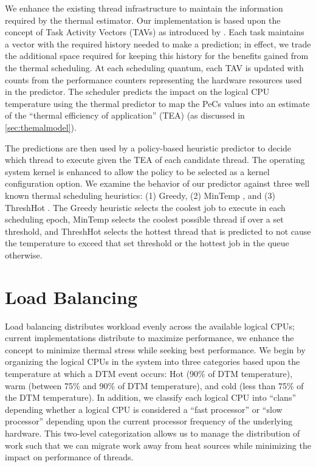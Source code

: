 We enhance the existing thread infrastructure to maintain
the information required by the thermal estimator. Our implementation is
based upon the concept of Task Activity Vectors (TAVs) as introduced by 
.  Each task maintains a vector with the required
history needed to make a prediction; in effect, we trade the additional
space required for keeping this history for the benefits gained from the
thermal scheduling.   At each scheduling quantum, each TAV is updated
with counts from the performance counters representing the hardware
resources used in the predictor.   The scheduler predicts the impact on
the logical CPU temperature using the thermal predictor to map the
PeCs values into an estimate of the ``thermal efficiency of
application'' (TEA) (as discussed in \ref{sec:themalmodel}).  

The predictions are then used by a policy-based heuristic predictor to
decide which thread to execute given the TEA of each candidate thread.
The operating system kernel is enhanced to allow the policy to be
selected as a kernel configuration option. We examine the behavior of
our predictor against three well known thermal scheduling heuristics:
(1) Greedy, (2) MinTemp \cite{Kursun2006}, and (3) ThreshHot
\cite{Zhou2010b}.  The Greedy heuristic selects the coolest job to
execute in each scheduling epoch, MinTemp selects the coolest possible
thread if over a set threshold, and ThreshHot selects the hottest thread
that is predicted to not cause the temperature to exceed that set
threshold or the hottest job in the queue otherwise.

\section{Load Balancing}
\label{sec:loadbalance}
Load balancing distributes workload evenly across the available logical
CPUs; current implementations distribute to maximize performance, we
enhance the concept to minimize thermal stress while seeking best
performance. We begin by organizing the logical CPUs in the system into
three categories based upon the temperature at which a DTM event occurs:
Hot (90\% of DTM temperature), warm (between 75\% and 90\% of DTM
temperature), and cold (less than 75\% of the DTM temperature).  In
addition, we classify each logical CPU into ``clans'' depending whether
a logical CPU is considered a ``fast processor'' or ``slow processor''
depending upon the current processor frequency of the underlying
hardware.  This two-level categorization allows us to manage the
distribution of work such that we can migrate work away from heat
sources while minimizing the impact on performance of threads.

